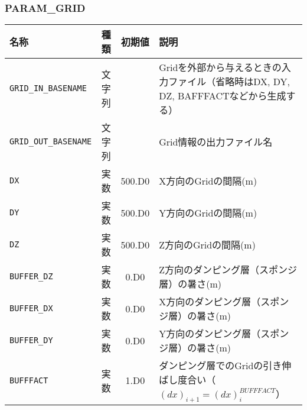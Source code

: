 \subsubsection{PARAM\_GRID}
\begin{tabularx}{150mm}{|l|c|c|X|} \hline
 \rowcolor[gray]{0.9} 名称 & 種類 & 初期値 & 説明 \\ \hline
 \verb|GRID_IN_BASENAME| & 文字列 &  & Gridを外部から与えるときの入力ファイル（省略時はDX, DY, DZ, BAFFFACTなどから生成する） \\ \hline
 \verb|GRID_OUT_BASENAME| & 文字列 &  & Grid情報の出力ファイル名 \\ \hline
 \verb|DX| & 実数 & 500.D0 & X方向のGridの間隔(m) \\ \hline
 \verb|DY| & 実数 & 500.D0 & Y方向のGridの間隔(m) \\ \hline
 \verb|DZ| & 実数 & 500.D0 & Z方向のGridの間隔(m) \\ \hline
 \verb|BUFFER_DZ| & 実数 & 0.D0 & Z方向のダンピング層（スポンジ層）の暑さ(m) \\ \hline
 \verb|BUFFER_DX| & 実数 & 0.D0 & X方向のダンピング層（スポンジ層）の暑さ(m) \\ \hline
 \verb|BUFFER_DY| & 実数 & 0.D0 & Y方向のダンピング層（スポンジ層）の暑さ(m) \\ \hline
 \verb|BUFFFACT| & 実数 & 1.D0 & ダンピング層でのGridの引き伸ばし度合い（$(dx)_{i+1}=(dx)^{BUFFFACT}_{i}$） \\ \hline
\end{tabularx}


